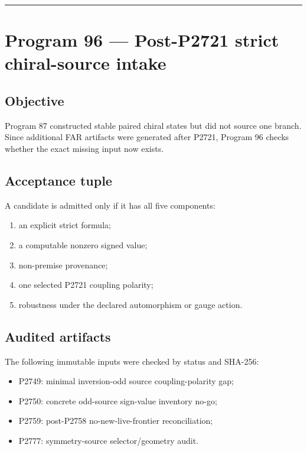 \documentclass[11pt,a4paper,openany]{report}
\begin{document}
\par\medskip\hrule\medskip

\chapter{Program 96 --- Post-P2721 strict chiral-source intake}

\section{Objective}

Program 87 constructed stable paired chiral states but did not source one branch. Since additional FAR artifacts were generated after P2721, Program 96 checks whether the exact missing input now exists.

\section{Acceptance tuple}

A candidate is admitted only if it has all five components:

\begin{enumerate}
\item 
an explicit strict formula;

\item 
a computable nonzero signed value;

\item 
non-premise provenance;

\item 
one selected P2721 coupling polarity;

\item 
robustness under the declared automorphism or gauge action.

\end{enumerate}

\section{Audited artifacts}

The following immutable inputs were checked by status and SHA-256:

\begin{itemize}
\item 
P2749: minimal inversion-odd source coupling-polarity gap;

\item 
P2750: concrete odd-source sign-value inventory no-go;

\item 
P2759: post-P2758 no-new-live-frontier reconciliation;

\item 
P2777: symmetry-source selector/\allowbreak{}geometry audit.

\end{itemize}
\end{document}
